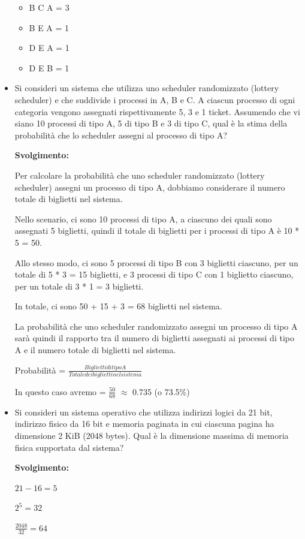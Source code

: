 \documentclass{article}
\begin{document}
\begin{itemize}
\begin{center}
        \begin{itemize}
            \item B C A = 3
            \item B E A = 1
            \item D E A = 1
            \item D E B = 1
        \end{itemize}
    \end{center}
    \item Si consideri un sistema che utilizza uno scheduler randomizzato (lottery scheduler) e che suddivide i processi in A, B e C. A ciascun processo di ogni categoria vengono assegnati rispettivamente 5, 3 e 1 ticket. Assumendo che vi siano 10 processi di tipo A, 5 di tipo B e 3 di tipo C, qual è la stima della probabilità che lo scheduler assegni al processo di tipo A?\par
    \textbf{Svolgimento:}\par
    Per calcolare la probabilità che uno scheduler randomizzato (lottery scheduler) assegni un processo di tipo A, dobbiamo considerare il numero totale di biglietti nel sistema.

    Nello scenario, ci sono 10 processi di tipo A, a ciascuno dei quali sono assegnati 5 biglietti, quindi il totale di biglietti per i processi di tipo A è 10 * 5 = 50.
    
    Allo stesso modo, ci sono 5 processi di tipo B con 3 biglietti ciascuno, per un totale di 5 * 3 = 15 biglietti, e 3 processi di tipo C con 1 biglietto ciascuno, per un totale di 3 * 1 = 3 biglietti.
    
    In totale, ci sono 50 + 15 + 3 = 68 biglietti nel sistema.
    
    La probabilità che uno scheduler randomizzato assegni un processo di tipo A sarà quindi il rapporto tra il numero di biglietti assegnati ai processi di tipo A e il numero totale di biglietti nel sistema.
    \begin{center}
        Probabilità = $\frac{Biglietti di tipo A}{Totale dei biglietti nel sistema}$
    \end{center}
    In questo caso avremo = $\frac{50}{68}$ $\approx$ 0.735 (o 73.5\%)

    \item Si consideri un sistema operativo che utilizza indirizzi logici da 21 bit, indirizzo fisico da 16 bit e memoria paginata in cui ciascuna pagina ha dimensione 2 KiB (2048 bytes). Qual è la dimensione massima di memoria fisica supportata dal sistema?\par
    \textbf{Svolgimento:}\par
    \begin{center}
        $21-16 = 5$ \par
        $2^{5} = 32$\par
        $\frac{2048}{32} = 64$\par
    \end{center}


\end{itemize}
\end{document}
